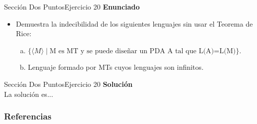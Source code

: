 \documentclass[10pt, envcountsect, presentation, aspectratio=169]{beamer}
\begin{document}

\begin{frame}{Sección Dos Puntos}{Ejercicio 20}
    \textbf{Enunciado}
    \begin{itemize}
        \item Demuestra la indecibilidad de los siguientes lenguajes sin usar el Teorema de Rice:
        \begin{enumerate}[a)]
            \item $\{\langle M \rangle \mid \mbox{M es MT y  se puede diseñar  un PDA A tal que L(A)=L(M)}\}$.
            \item Lenguaje formado por MTs  cuyos lenguajes son infinitos.
        \end{enumerate}
    \end{itemize}
\end{frame}


\begin{frame}{Sección Dos Puntos}{Ejercicio 20}
    \textbf{Solución}\\
    La solución es...
\end{frame}




\begin{frame} %
	\frametitle{Referencias}
	\footnotesize
	
		
\end{frame}    
		
\end{document}
